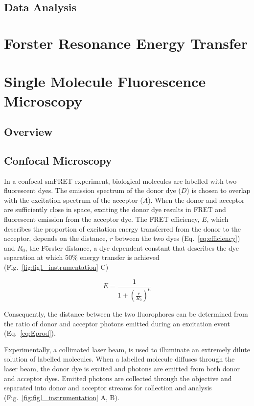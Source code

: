 \subsection{Data Analysis}

\section{Forster Resonance Energy Transfer}

\section{Single Molecule Fluorescence Microscopy}
\subsection{Overview}
\subsection{Confocal Microscopy}
In a confocal smFRET experiment, biological molecules are labelled with two fluorescent dyes. The emission spectrum of the donor dye ($D$) is chosen to overlap with the excitation spectrum of the acceptor ($A$). When the donor and acceptor are sufficiently close in space, exciting the donor dye results in FRET and fluorescent emission from the acceptor dye. The FRET efficiency, $E$, which describes the proportion of excitation energy transferred from the donor to the acceptor, depends on the distance, $r$ between the two dyes (Eq.~\ref{eq:efficiency}) and $R_0$, the F\"{o}rster distance, a dye dependent constant that describes the dye separation at which 50\% energy transfer is achieved (Fig.~\ref{fig:fig1_instrumentation} C)

\begin{equation}
E = \frac{1}{1 + (\frac{r}{R_0})^6} 
\label{eq:efficiency}
\end{equation}

Consequently, the distance between the two fluorophores can be determined from the ratio of donor and acceptor photons emitted during an excitation event (Eq.~\ref{eq:Eprod}).

Experimentally, a collimated laser beam, is used to illuminate an extremely dilute solution of labelled molecules. When a labelled molecule diffuses through the laser beam, the donor dye is excited and photons are emitted from both donor and acceptor dyes.  Emitted photons are collected through the objective and separated into donor and acceptor streams for collection and analysis (Fig.~\ref{fig:fig1_instrumentation} A, B). 

